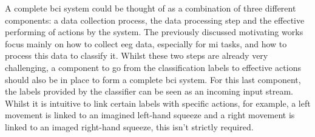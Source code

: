 A complete \gls{bci} system could be thought of as a combination of three different components: a data collection process, the data processing step and the effective performing of actions by the system.
The previously discussed motivating works focus mainly on how to collect \gls{eeg} data, especially for \gls{mi} tasks, and how to process this data to classify it.
Whilst these two steps are already very challenging, a component to go from the classification labels to effective actions should also be in place to form a complete \gls{bci} system.
For this last component, the labels provided by the classifier can be seen as an incoming input stream.
Whilst it is intuitive to link certain labels with specific actions, for example, a left movement is linked to an imagined left-hand squeeze and a right movement is linked to an imaged right-hand squeeze, this isn't strictly required.

